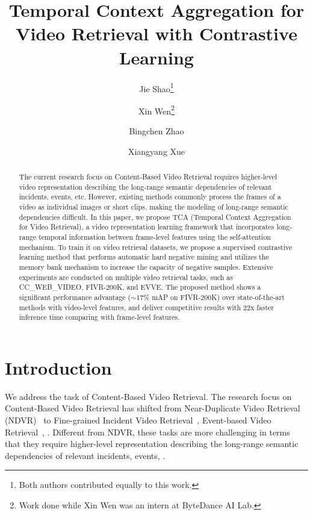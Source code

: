 \documentclass[10pt,twocolumn,letterpaper]{article}
\newcommand\CoAuthorMark{\footnotemark[\arabic{footnote}]}
\begin{document}
\title{Temporal Context Aggregation for Video Retrieval with Contrastive Learning}

\author[1,3]{Jie Shao\thanks{Both authors contributed equally to this work.}}
\author[2,3]{Xin Wen\protect\CoAuthorMark\thanks{Work done while Xin Wen was an intern at ByteDance AI Lab.}}
\author[2]{Bingchen Zhao}
\author[1]{Xiangyang Xue}

\maketitle


\begin{abstract}
The current research focus on Content-Based Video Retrieval requires higher-level video representation describing the long-range semantic dependencies of relevant incidents, events, etc. However, existing methods commonly process the frames of a video as individual images or short clips, making the modeling of long-range semantic dependencies difficult. In this paper, we propose TCA (Temporal Context Aggregation for Video Retrieval), a video representation learning framework that incorporates long-range temporal information between frame-level features using the self-attention mechanism. To train it on video retrieval datasets, we propose a supervised contrastive learning method that performs automatic hard negative mining and utilizes the memory bank mechanism to increase the capacity of negative samples. Extensive experiments are conducted on multiple video retrieval tasks, such as CC\_WEB\_VIDEO, FIVR-200K, and EVVE. The proposed method shows a significant performance advantage ($\sim17\%$ mAP on FIVR-200K) over state-of-the-art methods with video-level features, and deliver competitive results with 22x faster inference time comparing with frame-level features.
\end{abstract}


\section{Introduction}
We address the task of Content-Based Video Retrieval. The research focus on Content-Based Video Retrieval has shifted from Near-Duplicate Video Retrieval (NDVR)~\cite{wu2007practical,jiang2014vcdb} to Fine-grained Incident Video Retrieval~\cite{kordopatis2019fivr}, Event-based Video Retrieval~\cite{revaud2013event}, \etc. Different from NDVR, these tasks are more challenging in terms that they require higher-level representation describing the long-range semantic dependencies of relevant incidents, events, \etc.
\end{document}
